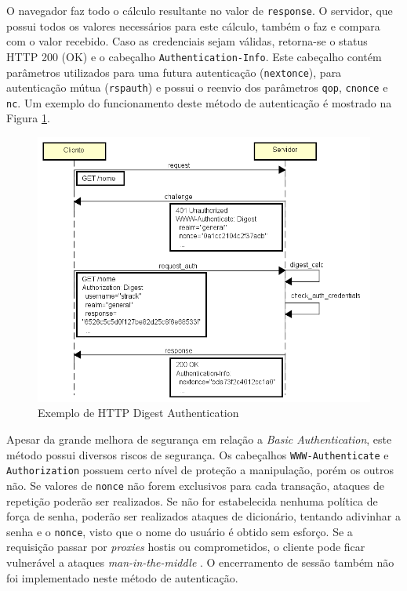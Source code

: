 \documentclass[12pt]{article}
\begin{document}
O navegador faz todo o cálculo resultante no valor de \texttt{response}. O servidor, que possui 
todos os valores necessários para este cálculo, também o faz e compara com o valor recebido. Caso 
as credenciais sejam válidas, retorna-se o status HTTP 200 (OK) e o cabeçalho 
\texttt{Authentication-Info}. Este cabeçalho contém parâmetros utilizados para uma futura 
autenticação (\texttt{nextonce}), para autenticação mútua (\texttt{rspauth}) e possui o reenvio dos 
parâmetros \texttt{qop}, \texttt{cnonce} e \texttt{nc}. Um exemplo do funcionamento deste método de 
autenticação é mostrado na Figura \ref{fig:digestAuth}.

\begin{figure}[ht]
  \centering
  \includegraphics[width=.8\textwidth]{Digest Authentication (Simplified).png}
  \caption{Exemplo de HTTP Digest Authentication}
  \label{fig:digestAuth}
\end{figure}

Apesar da grande melhora de segurança em relação a \emph{Basic Authentication}, este método possui 
diversos riscos de segurança. Os cabeçalhos \texttt{WWW-Authenticate} e \texttt{Authorization} 
possuem certo nível de proteção a manipulação, porém os outros não. Se valores de \texttt{nonce} 
não forem exclusivos para cada transação, ataques de repetição poderão ser realizados. Se não for 
estabelecida nenhuma política de força de senha, poderão ser realizados ataques de dicionário, 
tentando adivinhar a senha e o \texttt{nonce}, visto que o nome do usuário é obtido sem esforço.
Se a requisição passar por \emph{proxies} hostis ou comprometidos, o cliente pode ficar vulnerável 
a ataques \emph{man-in-the-middle} \cite{GOURLEY2002}. O encerramento de sessão também não foi 
implementado neste método de autenticação.
\end{document}

